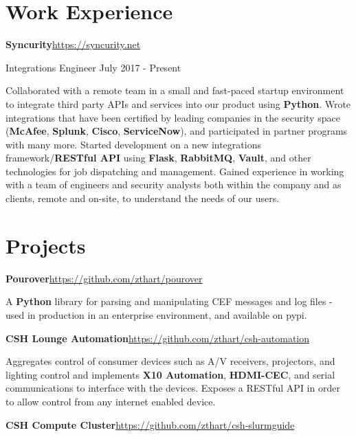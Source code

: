 \documentclass[margin,line]{resume}
\newcommand{\rurl}[1]{\hfill {\footnotesize \url{#1}}}
\begin{document}
\begin{resume}
\section{\mysidestyle Work Experience}
	\begin{asparablank}
		\item{\bf Syncurity}\rurl{https://syncurity.net}
		\small \item Integrations Engineer \hfill July 2017 - Present
		\linebreak

		\small Collaborated with a remote team in a small and fast-paced startup environment to integrate third party APIs and services into our product using \textbf{Python}.
		\small Wrote integrations that have been certified by leading companies in the security space (\textbf{McAfee}, \textbf{Splunk}, \textbf{Cisco}, \textbf{ServiceNow}), and participated in partner programs with many more.
		\small Started development on a new integrations framework/\textbf{RESTful API} using \textbf{Flask}, \textbf{RabbitMQ}, \textbf{Vault}, and other technologies for job dispatching and management.
		\small Gained experience in working with a team of engineers and security analysts both within the company and as clients, remote and on-site, to understand the needs of our users.
	\end{asparablank}

\section{\mysidestyle Projects}
	\begin{asparablank}
		\item {\bf Pourover}\rurl{https://github.com/zthart/pourover}

		\small A \textbf{Python} library for parsing and manipulating CEF messages and log files - used in production in an enterprise environment, and available on pypi.
		\normalsize
		\\
		\item {\bf CSH Lounge Automation}\rurl{https://github.com/zthart/csh-automation}

		\small Aggregates control of consumer devices such as A/V receivers, projectors, and lighting control and implements \textbf{X10 Automation}, \textbf{HDMI-CEC}, and serial communications to interface with the devices. Exposes a RESTful API in order to allow control from any internet enabled device.
		\normalsize
        \\
		\item {\bf CSH Compute Cluster}\rurl{https://github.com/zthart/csh-slurmguide}


\end{asparablank}
\end{resume}
\end{document}
